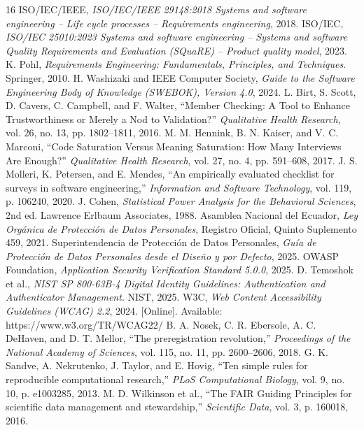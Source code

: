 \documentclass[11pt,a4paper,twoside]{article}
\begin{document}
\clearpage
\begin{thebibliography}{16}
 ISO/IEC/IEEE, \emph{ISO/IEC/IEEE 29148:2018 Systems and software engineering -- Life cycle processes -- Requirements engineering}, 2018.
 ISO/IEC, \emph{ISO/IEC 25010:2023 Systems and software engineering -- Systems and software Quality Requirements and Evaluation (SQuaRE) -- Product quality model}, 2023.
 K. Pohl, \emph{Requirements Engineering: Fundamentals, Principles, and Techniques}. Springer, 2010.
 H. Washizaki and IEEE Computer Society, \emph{Guide to the Software Engineering Body of Knowledge (SWEBOK), Version 4.0}, 2024.
 L. Birt, S. Scott, D. Cavers, C. Campbell, and F. Walter, ``Member Checking: A Tool to Enhance Trustworthiness or Merely a Nod to Validation?'' \emph{Qualitative Health Research}, vol. 26, no. 13, pp. 1802--1811, 2016.
 M. M. Hennink, B. N. Kaiser, and V. C. Marconi, ``Code Saturation Versus Meaning Saturation: How Many Interviews Are Enough?'' \emph{Qualitative Health Research}, vol. 27, no. 4, pp. 591--608, 2017.
 J. S. Molleri, K. Petersen, and E. Mendes, ``An empirically evaluated checklist for surveys in software engineering,'' \emph{Information and Software Technology}, vol. 119, p. 106240, 2020.
 J. Cohen, \emph{Statistical Power Analysis for the Behavioral Sciences}, 2nd ed. Lawrence Erlbaum Associates, 1988.
 Asamblea Nacional del Ecuador, \emph{Ley Orgánica de Protección de Datos Personales}, Registro Oficial, Quinto Suplemento 459, 2021.
 Superintendencia de Protección de Datos Personales, \emph{Guía de Protección de Datos Personales desde el Diseño y por Defecto}, 2025.
 OWASP Foundation, \emph{Application Security Verification Standard 5.0.0}, 2025.
 D. Temoshok et al., \emph{NIST SP 800-63B-4 Digital Identity Guidelines: Authentication and Authenticator Management}. NIST, 2025.
 W3C, \emph{Web Content Accessibility Guidelines (WCAG) 2.2}, 2024. [Online]. Available: https://www.w3.org/TR/WCAG22/
 B. A. Nosek, C. R. Ebersole, A. C. DeHaven, and D. T. Mellor, ``The preregistration revolution,'' \emph{Proceedings of the National Academy of Sciences}, vol. 115, no. 11, pp. 2600--2606, 2018.
 G. K. Sandve, A. Nekrutenko, J. Taylor, and E. Hovig, ``Ten simple rules for reproducible computational research,'' \emph{PLoS Computational Biology}, vol. 9, no. 10, p. e1003285, 2013.
 M. D. Wilkinson et al., ``The FAIR Guiding Principles for scientific data management and stewardship,'' \emph{Scientific Data}, vol. 3, p. 160018, 2016.
\end{thebibliography}
\end{document}
